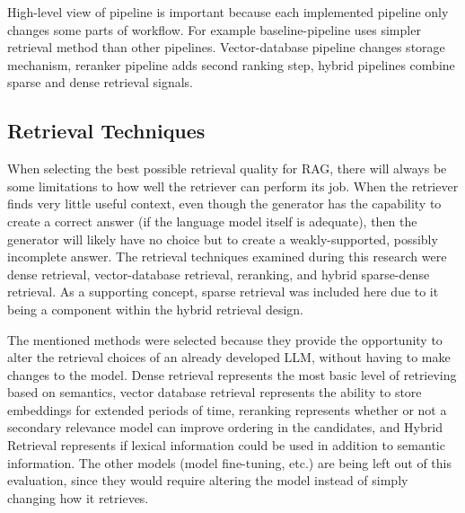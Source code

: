 High-level view of pipeline is important because each implemented pipeline only changes some parts of workflow. For example baseline-pipeline uses simpler retrieval method than other pipelines. Vector-database pipeline changes storage mechanism, reranker pipeline adds second ranking step, hybrid pipelines combine sparse and dense retrieval signals.

\subsection{Retrieval Techniques}

When selecting the best possible retrieval quality for \ac{RAG}, there will always be some limitations to how well the retriever can perform its job. When the retriever finds very little useful context, even though the generator has the capability to create a correct answer (if the language model itself is adequate), then the generator will likely have no choice but to create a weakly-supported, possibly incomplete answer. The retrieval techniques examined during this research were dense retrieval, vector-database retrieval, reranking, and hybrid sparse-dense retrieval. As a supporting concept, sparse retrieval was included here due to it being a component within the hybrid retrieval design.

The mentioned methods were selected because they provide the opportunity to alter the retrieval choices of an already developed \acf{LLM}, without having to make changes to the model. Dense retrieval represents the most basic level of retrieving based on semantics, vector database retrieval represents the ability to store embeddings for extended periods of time, reranking represents whether or not a secondary relevance model can improve ordering in the candidates, and Hybrid Retrieval represents if lexical information could be used in addition to semantic information. The other models (model fine-tuning, etc.) are being left out of this evaluation, since they would require altering the model instead of simply changing how it retrieves.

